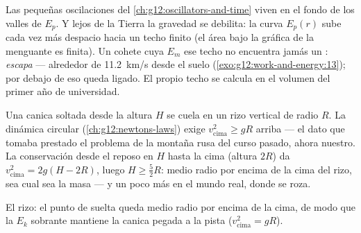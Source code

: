 \begin{remark}\label{rem:g12:work-and-energy:escape}
Las pequeñas oscilaciones del \cref{ch:g12:oscillators-and-time} viven en el fondo de
los valles de $E_p$. Y lejos de la Tierra la gravedad se debilita: la curva $E_p(r)$
sube cada vez más despacio hacia un techo finito (el área bajo la gráfica de la 
menguante es finita). Un cohete cuya $E_m$  ese techo no encuentra jamás un
: \emph{escapa} --- alrededor de
\qty{11.2}{km/s} desde el suelo (\cref{exo:g12:work-and-energy:13}); por debajo de eso
queda ligado. El propio techo se calcula en el volumen del primer año de universidad.
\end{remark}

\begin{example}[El rizo]\label{ex:g12:work-and-energy:loop}
Una canica soltada desde la altura $H$ se cuela en un rizo vertical de radio $R$. La
dinámica circular (\cref{ch:g12:newtons-laws}) exige $v_{\text{cima}}^2 \geq gR$
arriba --- el dato que tomaba prestado el problema de la montaña rusa del curso
pasado, ahora nuestro. La conservación desde el reposo en $H$ hasta la cima (altura
$2R$) da $v_{\text{cima}}^2 = 2g(H - 2R)$, luego $H \geq \tfrac52 R$: medio radio por
encima de la cima del rizo, sea cual sea la masa --- y un poco más en el mundo real,
donde se roza.
\end{example}

\begin{omfigure}

{\small El rizo: el punto de suelta queda medio radio por encima de la cima, de modo
que la $E_k$ sobrante mantiene la canica pegada a la pista
($v_{\text{cima}}^2 = gR$).}
\end{omfigure}

